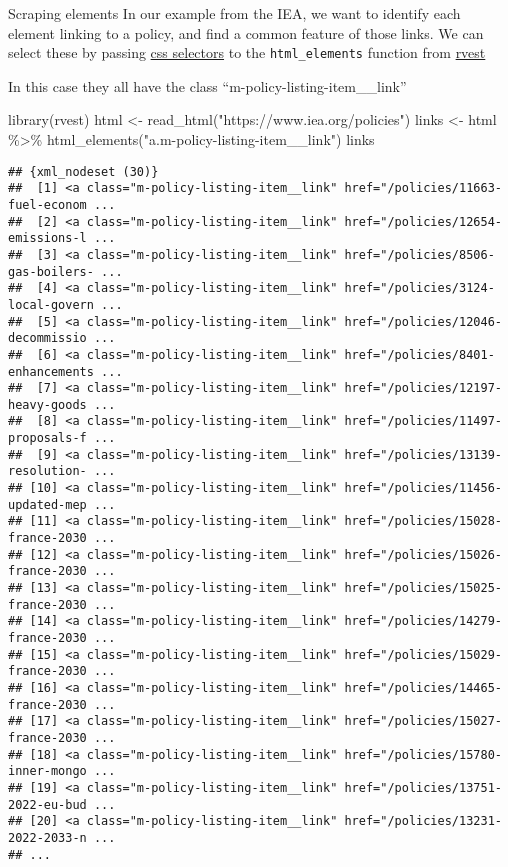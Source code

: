 \documentclass[
  10pt,
  ignorenonframetext,
  aspectratio=169]{beamer}
\newenvironment{Shaded}{\begin{snugshade}}{\end{snugshade}}
\newcommand{\FunctionTok}[1]{\textcolor[rgb]{0.94,0.94,0.56}{#1}}
\newcommand{\NormalTok}[1]{\textcolor[rgb]{0.80,0.80,0.80}{#1}}
\newcommand{\OtherTok}[1]{\textcolor[rgb]{0.94,0.94,0.56}{#1}}
\newcommand{\SpecialCharTok}[1]{\textcolor[rgb]{0.86,0.64,0.64}{#1}}
\newcommand{\StringTok}[1]{\textcolor[rgb]{0.80,0.58,0.58}{#1}}
\begin{document}
\begin{frame}[fragile]{Scraping elements}
\protect\hypertarget{scraping-elements}{}
In our example from the IEA, we want to identify each element linking to
a policy, and find a common feature of those links. We can select these
by passing
\href{https://developer.mozilla.org/en-US/docs/Learn/CSS/Building_blocks/Selectors}{css
selectors} to the \texttt{html\_elements} function from
\href{https://rvest.tidyverse.org/}{rvest}

In this case they all have the class ``m-policy-listing-item\_\_link''

\scriptsize

\begin{Shaded}
\begin{Highlighting}[]
\FunctionTok{library}\NormalTok{(rvest)}
\NormalTok{html }\OtherTok{\textless{}{-}} \FunctionTok{read\_html}\NormalTok{(}\StringTok{"https://www.iea.org/policies"}\NormalTok{)}
\NormalTok{links }\OtherTok{\textless{}{-}}\NormalTok{ html }\SpecialCharTok{\%\textgreater{}\%} \FunctionTok{html\_elements}\NormalTok{(}\StringTok{"a.m{-}policy{-}listing{-}item\_\_link"}\NormalTok{)}
\NormalTok{links}
\end{Highlighting}
\end{Shaded}

\begin{verbatim}
## {xml_nodeset (30)}
##  [1] <a class="m-policy-listing-item__link" href="/policies/11663-fuel-econom ...
##  [2] <a class="m-policy-listing-item__link" href="/policies/12654-emissions-l ...
##  [3] <a class="m-policy-listing-item__link" href="/policies/8506-gas-boilers- ...
##  [4] <a class="m-policy-listing-item__link" href="/policies/3124-local-govern ...
##  [5] <a class="m-policy-listing-item__link" href="/policies/12046-decommissio ...
##  [6] <a class="m-policy-listing-item__link" href="/policies/8401-enhancements ...
##  [7] <a class="m-policy-listing-item__link" href="/policies/12197-heavy-goods ...
##  [8] <a class="m-policy-listing-item__link" href="/policies/11497-proposals-f ...
##  [9] <a class="m-policy-listing-item__link" href="/policies/13139-resolution- ...
## [10] <a class="m-policy-listing-item__link" href="/policies/11456-updated-mep ...
## [11] <a class="m-policy-listing-item__link" href="/policies/15028-france-2030 ...
## [12] <a class="m-policy-listing-item__link" href="/policies/15026-france-2030 ...
## [13] <a class="m-policy-listing-item__link" href="/policies/15025-france-2030 ...
## [14] <a class="m-policy-listing-item__link" href="/policies/14279-france-2030 ...
## [15] <a class="m-policy-listing-item__link" href="/policies/15029-france-2030 ...
## [16] <a class="m-policy-listing-item__link" href="/policies/14465-france-2030 ...
## [17] <a class="m-policy-listing-item__link" href="/policies/15027-france-2030 ...
## [18] <a class="m-policy-listing-item__link" href="/policies/15780-inner-mongo ...
## [19] <a class="m-policy-listing-item__link" href="/policies/13751-2022-eu-bud ...
## [20] <a class="m-policy-listing-item__link" href="/policies/13231-2022-2033-n ...
## ...
\end{verbatim}
\end{frame}
\end{document}
